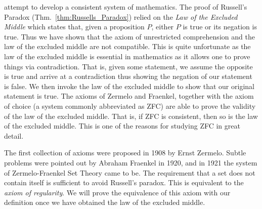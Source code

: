    attempt to develop a consistent system of mathematics. The proof of
    Russell's Paradox (Thm.~\ref{thm:Russells_Paradox}) relied on the
    \textit{Law of the Excluded Middle} which states that, given a proposition
    $P$, either $P$ is true or its negation is true. Thus we have shown that the
    axiom of unrestricted comprehension and the law of the excluded middle are
    not compatible. This is quite unfortunate as the law of the excluded middle
    is essential in mathematics as it allows one to prove things via
    contradiction. That is, given some statement, we assume the opposite is true
    and arrive at a contradiction thus showing the negation of our statement is
    false. We then invoke the law of the excluded middle to show that our
    original statement is true. The axioms of Zermelo and Fraenkel, together
    with the axiom of choice (a system commonly abbreviated as ZFC) are able to
    prove the validity of the law of the excluded middle. That is, if ZFC is
    consistent, then so is the law of the excluded middle. This is one of the
    reasons for studying ZFC in great detail.
    \par\hfill\par
    The first collection of axioms were proposed in 1908 by
    Ernst Zermelo. Subtle problems were pointed out by
    Abraham Fraenkel in 1920, and in 1921 the system of
    Zermelo-Fraenkel Set Theory came to be.
    The requirement that a set does not contain itself is sufficient to avoid
    Russell's paradox. This is equivalent to the
    \textit{axiom of regularity}. We will prove the
    equivalence of this axiom with our definition once we have obtained the law
    of the excluded middle.

